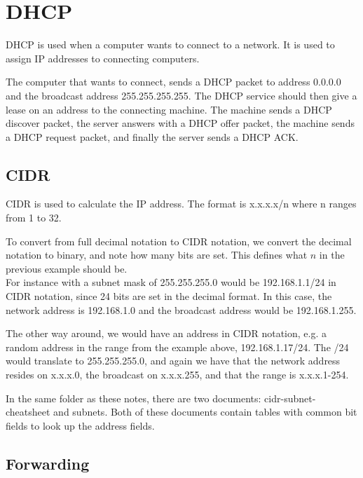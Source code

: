 \section{DHCP}
DHCP is used when a computer wants to connect to a network. It is used
to assign IP addresses to connecting computers.

The computer that wants to connect, sends a DHCP packet to address
0.0.0.0 and the broadcast address 255.255.255.255. The DHCP service
should then give a lease on an address to the connecting
machine. The machine sends a DHCP discover packet, the server answers
with a DHCP offer packet, the machine sends a DHCP request packet, and
finally the server sends a DHCP ACK.

\subsection{CIDR}
CIDR is used to calculate the IP address. The format is x.x.x.x/n
where n ranges from 1 to 32.

To convert from full decimal notation to CIDR notation, we convert the
decimal notation to binary, and note how many bits are set. This
defines what $n$ in the previous example should be.\\
For instance with a subnet mask of 255.255.255.0 would be
192.168.1.1/24 in CIDR notation, since 24 bits are set in the
decimal format. In this case, the network address is 192.168.1.0 and the
broadcast address would be 192.168.1.255.

The other way around, we would have an address in CIDR notation, e.g. a random
address in the range from the example above, 192.168.1.17/24. The /24 would
translate to 255.255.255.0, and again we have that the network address resides
on x.x.x.0, the broadcast on x.x.x.255, and that the range is x.x.x.1-254.

In the same folder as these notes, there are two documents: cidr-subnet-cheatsheet
and subnets. Both of these documents contain tables with common bit fields to
look up the address fields.

\subsection{Forwarding}
